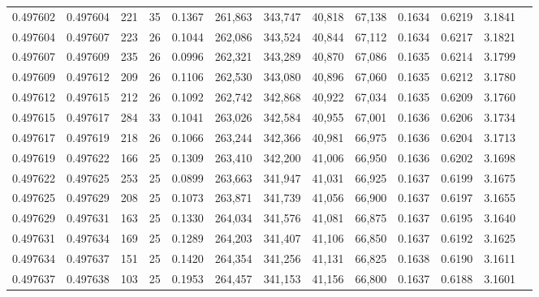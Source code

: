 \begin{tabular}{rrrrrrrrrrrrr}
0.497602 & 0.497604 & 221 &  35 &                                     0.1367 & 261,863 & 343,747 &  40,818 &  67,138 & 0.1634 & 0.6219 & 3.1841 \\
0.497604 & 0.497607 & 223 &  26 &                                     0.1044 & 262,086 & 343,524 &  40,844 &  67,112 & 0.1634 & 0.6217 & 3.1821 \\
0.497607 & 0.497609 & 235 &  26 &                                     0.0996 & 262,321 & 343,289 &  40,870 &  67,086 & 0.1635 & 0.6214 & 3.1799 \\
0.497609 & 0.497612 & 209 &  26 &                                     0.1106 & 262,530 & 343,080 &  40,896 &  67,060 & 0.1635 & 0.6212 & 3.1780 \\
0.497612 & 0.497615 & 212 &  26 &                                     0.1092 & 262,742 & 342,868 &  40,922 &  67,034 & 0.1635 & 0.6209 & 3.1760 \\
0.497615 & 0.497617 & 284 &  33 &                                     0.1041 & 263,026 & 342,584 &  40,955 &  67,001 & 0.1636 & 0.6206 & 3.1734 \\
0.497617 & 0.497619 & 218 &  26 &                                     0.1066 & 263,244 & 342,366 &  40,981 &  66,975 & 0.1636 & 0.6204 & 3.1713 \\
0.497619 & 0.497622 & 166 &  25 &                                     0.1309 & 263,410 & 342,200 &  41,006 &  66,950 & 0.1636 & 0.6202 & 3.1698 \\
0.497622 & 0.497625 & 253 &  25 &                                     0.0899 & 263,663 & 341,947 &  41,031 &  66,925 & 0.1637 & 0.6199 & 3.1675 \\
0.497625 & 0.497629 & 208 &  25 &                                     0.1073 & 263,871 & 341,739 &  41,056 &  66,900 & 0.1637 & 0.6197 & 3.1655 \\
0.497629 & 0.497631 & 163 &  25 &                                     0.1330 & 264,034 & 341,576 &  41,081 &  66,875 & 0.1637 & 0.6195 & 3.1640 \\
0.497631 & 0.497634 & 169 &  25 &                                     0.1289 & 264,203 & 341,407 &  41,106 &  66,850 & 0.1637 & 0.6192 & 3.1625 \\
0.497634 & 0.497637 & 151 &  25 &                                     0.1420 & 264,354 & 341,256 &  41,131 &  66,825 & 0.1638 & 0.6190 & 3.1611 \\
0.497637 & 0.497638 & 103 &  25 &                                     0.1953 & 264,457 & 341,153 &  41,156 &  66,800 & 0.1637 & 0.6188 & 3.1601 \\

\end{tabular}
